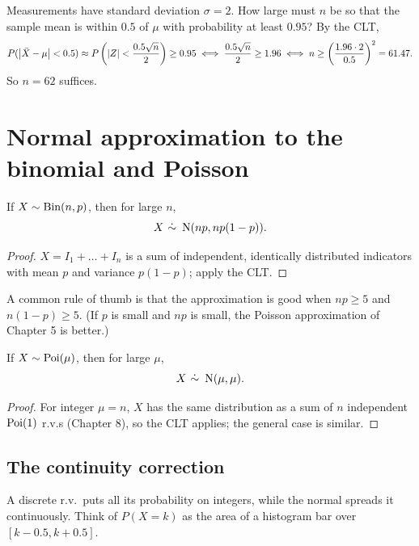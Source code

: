 \begin{example}
Measurements have standard deviation $\sigma = 2$. How large must $n$ be so that the
sample mean is within $0.5$ of $\mu$ with probability at least $0.95$? By the CLT,
\[
  P(\left\lvert \bar X - \mu \right\rvert < 0.5) \approx P\left(\left\lvert Z \right\rvert < \frac{0.5\sqrt n}{2}\right) \ge 0.95
  \iff \frac{0.5\sqrt n}{2}\ge 1.96 \iff n\ge\left(\frac{1.96\cdot 2}{0.5}\right)^2 = 61.47.
\]
So $n = 62$ suffices.
\end{example}

\section{Normal approximation to the binomial and Poisson}

\begin{theorem}
If $X\sim\operatorname{Bin}(n,p)$, then for large $n$,
\[
  X\ \dot\sim\ \operatorname{N}(np, np(1-p)).
\]
\end{theorem}

\begin{proof}
$X = I_1 + \dots + I_n$ is a sum of independent, identically distributed indicators with
mean $p$ and variance $p(1-p)$; apply the CLT.
\end{proof}

A common rule of thumb is that the approximation is good when $np\ge5$ and
$n(1-p)\ge5$. (If $p$ is small and $np$ is small, the Poisson approximation of Chapter 5 is
better.)

\begin{theorem}
If $X\sim\operatorname{Poi}(\mu)$, then for large $\mu$,
\[
  X\ \dot\sim\ \operatorname{N}(\mu,\mu).
\]
\end{theorem}

\begin{proof}
For integer $\mu = n$, $X$ has the same distribution as a sum of $n$ independent
$\operatorname{Poi}(1)$ r.v.s (Chapter 8), so the CLT applies; the general case is similar.
\end{proof}

\subsection{The continuity correction}

A discrete r.v.\ puts all its probability on integers, while the normal spreads it
continuously. Think of $P(X = k)$ as the area of a histogram bar over $[k-0.5, k+0.5]$.

